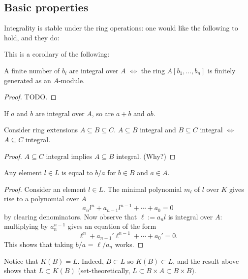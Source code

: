 \subsection{Basic properties}

Integrality is stable under the ring operations: one would like the following to
hold, and they do:

This is a corollary of the following:

\begin{theorem}{\label{module-integrality}}
  A finite number of $b_i$ are integral over $A$ $\iff$ the ring
  $A[b_1,\ldots,b_n]$ is finitely generated as an $A$-module.
\end{theorem}
\begin{proof}
  TODO.
\end{proof}

\begin{corollary}{\label{integrality-of-sums-products}}
  If $a$ and $b$ are integral over $A$, so are $a + b$ and $ab$.
\end{corollary}

\begin{theorem}{\label{integrality-trans}}
  Consider ring extensions $A \subseteq B \subseteq C$. $A \subseteq B$ integral
  and $B \subseteq C$ integral $\iff$ $A \subseteq C$ integral.
\end{theorem}
\begin{proof}
  $A \subseteq C$ integral implies $A \subseteq B$ integral. (Why?)
\end{proof}

\begin{theorem}
  Any element $l \in L$ is equal to $b/a$ for $b \in B$ and $a \in A$.
\end{theorem}

\begin{proof}
  Consider an element $l \in L$. The minimal polynomial $m_l$ of $l$ over $K$
  gives rise to a polynomial over $A$
  \[ a_nl^n + a_{n-1}l^{n-1} + \cdots + a_0 = 0 \] by clearing denominators. Now
  observe that $\ell := a_nl$ is integral over $A$: multiplying by $a_n^{n-1}$
  gives an equation of the form
  \[ \ell^n + a_{n-1}'\ell^{n-1} + \cdots + a_0' = 0. \] This shows that taking
  $b/a$ = $\ell/a_n$ works.
\end{proof}

\begin{remark}
  Notice that $K(B) = L$. Indeed, $B \subset L$ so $K(B) \subset L$, and the
  result above shows that $L \subset K(B)$ (set-theoretically, $L \subset B
  \times A \subset B \times B$).
\end{remark}

